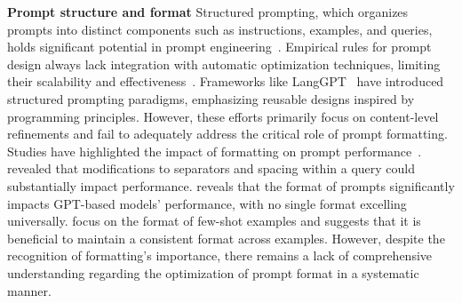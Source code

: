 
\noindent \textbf{Prompt structure and format}
Structured prompting, which organizes prompts into distinct components such as instructions, examples, and queries, holds significant potential in prompt engineering~\citep{promptbreeder}.
Empirical rules for prompt design always lack integration with automatic optimization techniques, limiting their scalability and effectiveness~\citep{O_2023_CRISPE,google2024Promptingguide101}.
Frameworks like LangGPT~\citep{A_2024_LangGPT} have introduced structured prompting paradigms, emphasizing reusable designs inspired by programming principles.
However, these efforts primarily focus on content-level refinements and fail to adequately address the critical role of prompt formatting.
Studies have highlighted the impact of formatting on prompt performance~\citep{salinas2024butterflyeffectalteringprompts}.
\citet{C_2024ICLR_formatspread} revealed that modifications to separators and spacing within a query could substantially impact performance.
\citet{he2024doespromptformattingimpact} 
reveals that the format of prompts significantly impacts GPT-based models’ performance, with no single format excelling universally.
\citet{voronov-etal-2024-mind} focus on the format of few-shot examples and suggests that it is beneficial to maintain a consistent format across examples.
However, despite the recognition of formatting's importance, there remains a lack of comprehensive understanding regarding the optimization of prompt format in a systematic manner. 


